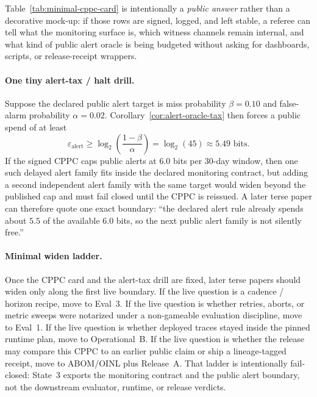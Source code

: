 \documentclass[11pt]{article}
\begin{document}
Table~\ref{tab:minimal-cppc-card} is intentionally a \emph{public answer} rather than a decorative mock-up: if those rows are signed, logged, and left stable, a referee can tell what the monitoring surface is, which witness channels remain internal, and what kind of public alert oracle is being budgeted without asking for dashboards, scripts, or release-receipt wrappers.

\paragraph{One tiny alert-tax / halt drill.}
Suppose the declared public alert target is miss probability $\beta=0.10$ and false-alarm probability $\alpha=0.02$.
Corollary~\ref{cor:alert-oracle-tax} then forces a public spend of at least
\[
\varepsilon_{\mathrm{alert}} \ge \log_2\!\left(\frac{1-\beta}{\alpha}\right)
= \log_2(45) \approx 5.49\text{ bits}.
\]
If the signed CPPC caps public alerts at $6.0$ bits per 30-day window, then one such delayed alert family fits inside the declared monitoring contract, but adding a second independent alert family with the same target would widen beyond the published cap and must fail closed until the CPPC is reissued.
A later terse paper can therefore quote one exact boundary: ``the declared alert rule already spends about $5.5$ of the available $6.0$ bits, so the next public alert family is not silently free.''

\paragraph{Minimal widen ladder.}
Once the CPPC card and the alert-tax drill are fixed, later terse papers should widen only along the first live boundary.
If the live question is a cadence / horizon recipe, move to Eval~3.
If the live question is whether retries, aborts, or metric sweeps were notarized under a non-gameable evaluation discipline, move to Eval~1.
If the live question is whether deployed traces stayed inside the pinned runtime plan, move to Operational~B.
If the live question is whether the release may compare this CPPC to an earlier public claim or ship a lineage-tagged receipt, move to ABOM/OINL plus Release~A.
That ladder is intentionally fail-closed: State~3 exports the monitoring contract and the public alert boundary, not the downstream evaluator, runtime, or release verdicts.
\end{document}
